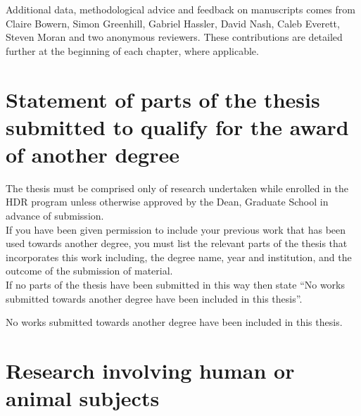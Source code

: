\noindent
Additional data, methodological advice and feedback on manuscripts comes from Claire Bowern, Simon Greenhill, Gabriel Hassler, David Nash, Caleb Everett, Steven Moran and two anonymous reviewers. These contributions are detailed further at the beginning of each chapter, where applicable.



\section*{Statement of parts of the thesis submitted to qualify for the award of another degree}

\begin{instructional}
    The thesis must be comprised only of research undertaken while enrolled in the HDR program unless otherwise approved by the Dean, Graduate School in advance of submission.\\
    
    \noindent
    If you have been given permission to include your previous work that has been used towards another degree, you must list the relevant parts of the thesis that incorporates this work including, the degree name, year and institution, and the outcome of the submission of material. \\
    
    \noindent
    If no parts of the thesis have been submitted in this way then state ``No works submitted towards another degree have been included in this thesis''.
\end{instructional}


No works submitted towards another degree have been included in this thesis.



\section*{Research involving human or animal subjects}

